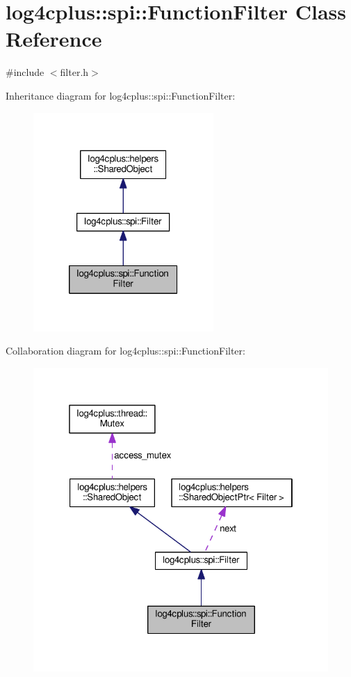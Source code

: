 \hypertarget{classlog4cplus_1_1spi_1_1FunctionFilter}{\section{log4cplus\-:\-:spi\-:\-:Function\-Filter Class Reference}
\label{classlog4cplus_1_1spi_1_1FunctionFilter}
}


{\ttfamily \#include $<$filter.\-h$>$}



Inheritance diagram for log4cplus\-:\-:spi\-:\-:Function\-Filter\-:
\nopagebreak
\begin{figure}[H]
\begin{center}
\leavevmode
\includegraphics[width=194pt]{classlog4cplus_1_1spi_1_1FunctionFilter__inherit__graph}
\end{center}
\end{figure}


Collaboration diagram for log4cplus\-:\-:spi\-:\-:Function\-Filter\-:
\nopagebreak
\begin{figure}[H]
\begin{center}
\leavevmode
\includegraphics[width=321pt]{classlog4cplus_1_1spi_1_1FunctionFilter__coll__graph}
\end{center}
\end{figure}
